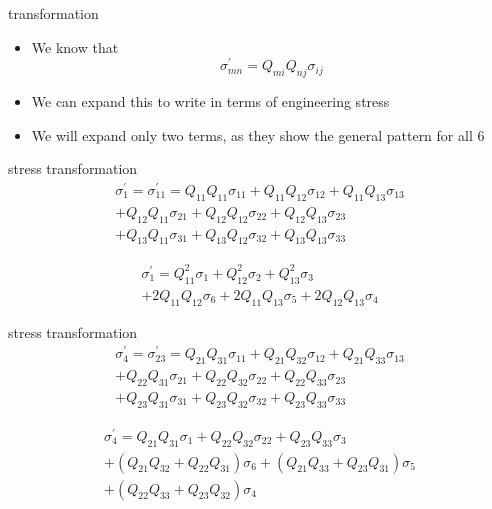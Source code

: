 \documentclass[
  letterpaper,
  ignorenonframetext,
  aspectratio=43,
  handout,
  12pt]{beamer}
\providecommand{\tightlist}{%
  \setlength{\itemsep}{0pt}\setlength{\parskip}{0pt}}
\providecommand{\tightlist}{%
\setlength{\itemsep}{0pt}\setlength{\parskip}{0pt}}
\begin{document}
\begin{frame}{transformation}
\protect\hypertarget{transformation}{}
\begin{itemize}
\tightlist
\item
  We know that \[\sigma_{mn}^\prime = Q_{mi}Q_{nj}\sigma_{ij}\]
\item
  We can expand this to write in terms of engineering stress
\item
  We will expand only two terms, as they show the general pattern for
  all 6
\end{itemize}
\end{frame}

\begin{frame}{stress transformation}
\protect\hypertarget{stress-transformation}{}
\[\begin{gathered}
    \sigma_{1}^\prime = \sigma_{11}^\prime =  Q_{11}Q_{11} \sigma_{11} + Q_{11}Q_{12} \sigma_{12} + Q_{11}Q_{13}\sigma_{13}\\
    + Q_{12}Q_{11} \sigma_{21} + Q_{12}Q_{12} \sigma_{22} + Q_{12}Q_{13}\sigma_{23}\\
    + Q_{13}Q_{11} \sigma_{31} + Q_{13}Q_{12} \sigma_{32} + Q_{13}Q_{13}\sigma_{33}
\end{gathered}\]

\[\begin{gathered}
    \sigma_{1}^\prime = Q_{11}^2 \sigma_{1} + Q_{12}^2 \sigma_{2} + Q_{13}^2\sigma_{3}\\
    + 2 Q_{11}Q_{12} \sigma_{6} + 2Q_{11}Q_{13}\sigma_{5} + 2Q_{12}Q_{13}\sigma_{4}
\end{gathered}\]
\end{frame}

\begin{frame}{stress transformation}
\protect\hypertarget{stress-transformation-1}{}
\[\begin{gathered}
    \sigma_{4}^\prime = \sigma_{23}^\prime =  Q_{21}Q_{31} \sigma_{11} + Q_{21}Q_{32} \sigma_{12} + Q_{21}Q_{33}\sigma_{13}\\
    + Q_{22}Q_{31} \sigma_{21} + Q_{22}Q_{32} \sigma_{22} + Q_{22}Q_{33}\sigma_{23}\\
    + Q_{23}Q_{31} \sigma_{31} + Q_{23}Q_{32} \sigma_{32} + Q_{23}Q_{33}\sigma_{33}
\end{gathered}\]

\[\begin{gathered}
    \sigma_{4}^\prime = Q_{21}Q_{31} \sigma_{1} + Q_{22}Q_{32} \sigma_{22} + Q_{23}Q_{33}\sigma_{3}\\
    + (Q_{21}Q_{32}+Q_{22}Q_{31}) \sigma_{6} + (Q_{21}Q_{33}+Q_{23}Q_{31})\sigma_{5}\\
    + (Q_{22}Q_{33}+Q_{23}Q_{32})\sigma_{4}
\end{gathered}\]
\end{frame}
\end{document}
